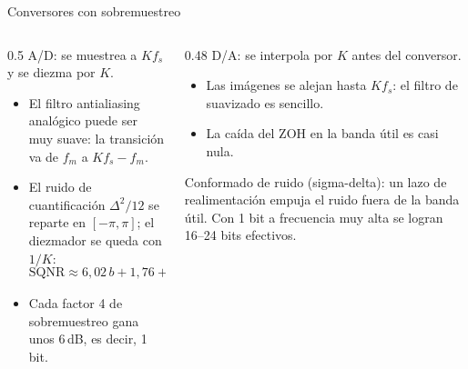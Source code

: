 \documentclass[aspectratio=169,11pt]{beamer}
\begin{document}
\begin{frame}{Conversores con sobremuestreo}
  \begin{columns}[T]
    \begin{column}{0.5\textwidth}
      \alert{A/D}: se muestrea a $K f_s$ y se diezma por $K$.
      \begin{itemize}\small
        \item El filtro antialiasing analógico puede ser muy suave: la transición va de $f_m$ a $Kf_s-f_m$.
        \item El ruido de cuantificación $\Delta^2/12$ se reparte en $[-\pi,\pi]$; el diezmador se queda con $1/K$:
        \[
          \mathrm{SQNR}\approx6{,}02\,b+1{,}76+10\log_{10}K\ \text{dB}
        \]
        \item Cada factor 4 de sobremuestreo gana unos 6\,dB, es decir, 1 bit.
      \end{itemize}
    \end{column}
    \begin{column}{0.48\textwidth}
      \alert{D/A}: se interpola por $K$ antes del conversor.
      \begin{itemize}\small
        \item Las imágenes se alejan hasta $Kf_s$: el filtro de suavizado es sencillo.
        \item La caída del ZOH en la banda útil es casi nula.
      \end{itemize}
      \medskip
      \alert{Conformado de ruido} (sigma-delta): un lazo de realimentación empuja el ruido fuera de la banda útil. Con 1 bit a frecuencia muy alta se logran 16–24 bits efectivos.
    \end{column}
  \end{columns}
\end{frame}

\end{document}
